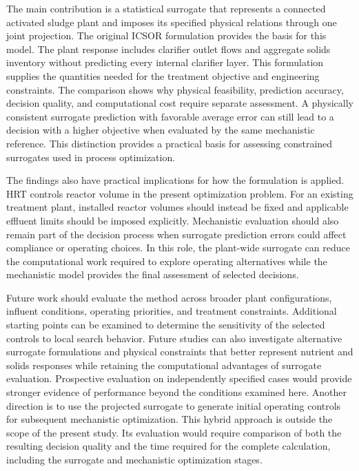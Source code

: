\documentclass[a4paper,fleqn]{cas-sc}
\begin{document}
The main contribution is a statistical surrogate that represents a connected activated sludge plant and imposes its specified physical relations through one joint projection. The original ICSOR formulation provides the basis for this model. The plant response includes clarifier outlet flows and aggregate solids inventory without predicting every internal clarifier layer. This formulation supplies the quantities needed for the treatment objective and engineering constraints. The comparison shows why physical feasibility, prediction accuracy, decision quality, and computational cost require separate assessment. A physically consistent surrogate prediction with favorable average error can still lead to a decision with a higher objective when evaluated by the same mechanistic reference. This distinction provides a practical basis for assessing constrained surrogates used in process optimization.

The findings also have practical implications for how the formulation is applied. HRT controls reactor volume in the present optimization problem. For an existing treatment plant, installed reactor volumes should instead be fixed and applicable effluent limits should be imposed explicitly. Mechanistic evaluation should also remain part of the decision process when surrogate prediction errors could affect compliance or operating choices. In this role, the plant-wide surrogate can reduce the computational work required to explore operating alternatives while the mechanistic model provides the final assessment of selected decisions.

Future work should evaluate the method across broader plant configurations, influent conditions, operating priorities, and treatment constraints. Additional starting points can be examined to determine the sensitivity of the selected controls to local search behavior. Future studies can also investigate alternative surrogate formulations and physical constraints that better represent nutrient and solids responses while retaining the computational advantages of surrogate evaluation. Prospective evaluation on independently specified cases would provide stronger evidence of performance beyond the conditions examined here. Another direction is to use the projected surrogate to generate initial operating controls for subsequent mechanistic optimization. This hybrid approach is outside the scope of the present study. Its evaluation would require comparison of both the resulting decision quality and the time required for the complete calculation, including the surrogate and mechanistic optimization stages.
\end{document}
